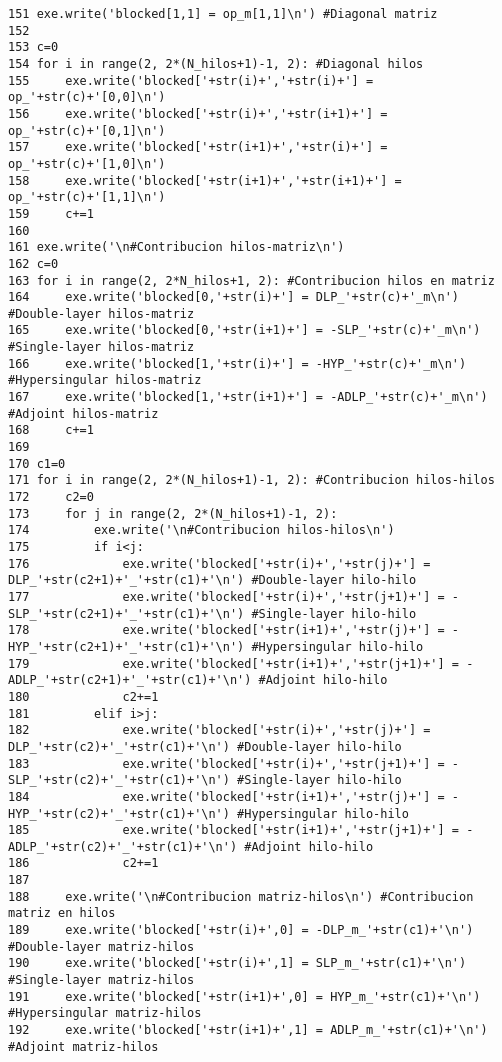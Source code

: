 \documentclass[12pt,letterpaper]{report}
\numberwithin{equation}{section}
\begin{document}
\begin{lstlisting}
151 exe.write('blocked[1,1] = op_m[1,1]\n') #Diagonal matriz
152 
153 c=0
154 for i in range(2, 2*(N_hilos+1)-1, 2): #Diagonal hilos
155     exe.write('blocked['+str(i)+','+str(i)+'] = op_'+str(c)+'[0,0]\n')
156     exe.write('blocked['+str(i)+','+str(i+1)+'] = op_'+str(c)+'[0,1]\n')
157     exe.write('blocked['+str(i+1)+','+str(i)+'] = op_'+str(c)+'[1,0]\n')
158     exe.write('blocked['+str(i+1)+','+str(i+1)+'] = op_'+str(c)+'[1,1]\n')
159     c+=1
160 
161 exe.write('\n#Contribucion hilos-matriz\n')
162 c=0
163 for i in range(2, 2*N_hilos+1, 2): #Contribucion hilos en matriz
164     exe.write('blocked[0,'+str(i)+'] = DLP_'+str(c)+'_m\n') #Double-layer hilos-matriz 
165     exe.write('blocked[0,'+str(i+1)+'] = -SLP_'+str(c)+'_m\n') #Single-layer hilos-matriz
166     exe.write('blocked[1,'+str(i)+'] = -HYP_'+str(c)+'_m\n') #Hypersingular hilos-matriz
167     exe.write('blocked[1,'+str(i+1)+'] = -ADLP_'+str(c)+'_m\n') #Adjoint hilos-matriz
168     c+=1
169 
170 c1=0
171 for i in range(2, 2*(N_hilos+1)-1, 2): #Contribucion hilos-hilos
172     c2=0
173     for j in range(2, 2*(N_hilos+1)-1, 2):
174         exe.write('\n#Contribucion hilos-hilos\n')
175         if i<j:
176             exe.write('blocked['+str(i)+','+str(j)+'] = DLP_'+str(c2+1)+'_'+str(c1)+'\n') #Double-layer hilo-hilo
177             exe.write('blocked['+str(i)+','+str(j+1)+'] = -SLP_'+str(c2+1)+'_'+str(c1)+'\n') #Single-layer hilo-hilo
178             exe.write('blocked['+str(i+1)+','+str(j)+'] = -HYP_'+str(c2+1)+'_'+str(c1)+'\n') #Hypersingular hilo-hilo
179             exe.write('blocked['+str(i+1)+','+str(j+1)+'] = -ADLP_'+str(c2+1)+'_'+str(c1)+'\n') #Adjoint hilo-hilo
180             c2+=1
181         elif i>j:
182             exe.write('blocked['+str(i)+','+str(j)+'] = DLP_'+str(c2)+'_'+str(c1)+'\n') #Double-layer hilo-hilo
183             exe.write('blocked['+str(i)+','+str(j+1)+'] = -SLP_'+str(c2)+'_'+str(c1)+'\n') #Single-layer hilo-hilo
184             exe.write('blocked['+str(i+1)+','+str(j)+'] = -HYP_'+str(c2)+'_'+str(c1)+'\n') #Hypersingular hilo-hilo
185             exe.write('blocked['+str(i+1)+','+str(j+1)+'] = -ADLP_'+str(c2)+'_'+str(c1)+'\n') #Adjoint hilo-hilo
186             c2+=1
187 
188     exe.write('\n#Contribucion matriz-hilos\n') #Contribucion matriz en hilos
189     exe.write('blocked['+str(i)+',0] = -DLP_m_'+str(c1)+'\n') #Double-layer matriz-hilos
190     exe.write('blocked['+str(i)+',1] = SLP_m_'+str(c1)+'\n') #Single-layer matriz-hilos
191     exe.write('blocked['+str(i+1)+',0] = HYP_m_'+str(c1)+'\n') #Hypersingular matriz-hilos 
192     exe.write('blocked['+str(i+1)+',1] = ADLP_m_'+str(c1)+'\n') #Adjoint matriz-hilos

\end{lstlisting}
\end{document}

